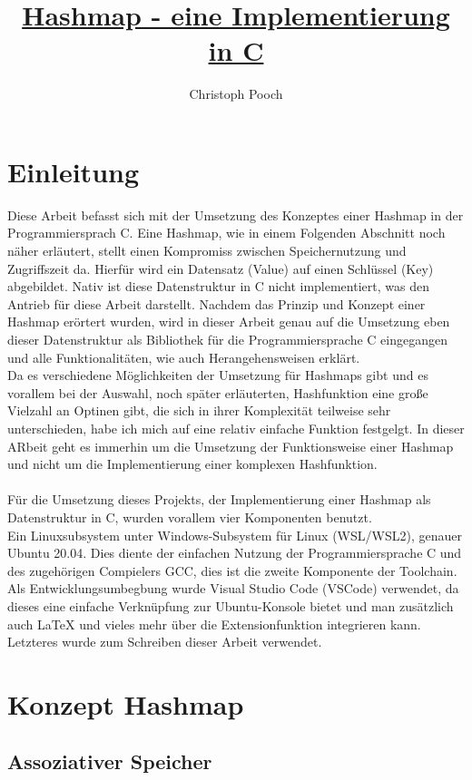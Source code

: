 \documentclass[11pt,a4paper]{article}
\author{Christoph Pooch}
\title{\underline{Hashmap - eine Implementierung in C}}
\begin{document}
\maketitle
\pagebreak
\tableofcontents
\pagebreak
\section{Einleitung}
Diese Arbeit befasst sich mit der Umsetzung des Konzeptes einer Hashmap in der Programmiersprach C.
Eine Hashmap, wie in einem Folgenden Abschnitt noch näher erläutert, stellt einen Kompromiss zwischen 
Speichernutzung und Zugriffszeit da.
Hierfür wird ein Datensatz (Value) auf einen Schlüssel (Key) abgebildet.
Nativ ist diese Datenstruktur in C nicht implementiert, was den Antrieb für diese Arbeit darstellt.
Nachdem das Prinzip und Konzept einer Hashmap erörtert wurden, wird in dieser Arbeit genau auf die Umsetzung 
eben dieser Datenstruktur als Bibliothek für die Programmiersprache C eingegangen und alle Funktionalitäten, 
wie auch Herangehensweisen erklärt.\\
Da es verschiedene Möglichkeiten der Umsetzung für Hashmaps gibt und es vorallem bei der Auswahl, noch 
später erläuterten, Hashfunktion eine große Vielzahl an Optinen gibt, die sich in ihrer Komplexität teilweise 
sehr unterschieden, habe ich mich auf eine relativ einfache Funktion festgelgt. %
In dieser ARbeit geht es immerhin um die Umsetzung der Funktionsweise einer Hashmap und nicht um die Implementierung 
einer komplexen Hashfunktion.\\\\ 
Für die Umsetzung dieses Projekts, der Implementierung einer Hashmap als Datenstruktur in C, wurden vorallem vier
Komponenten benutzt.\\
Ein Linuxsubsystem unter Windows-Subsystem für Linux (WSL/WSL2),
genauer Ubuntu 20.04. Dies diente der einfachen Nutzung der Programmiersprache C und des zugehörigen Compielers GCC, 
dies ist die zweite Komponente der Toolchain.\\
Als Entwicklungsumbegbung wurde Visual Studio Code (VSCode) verwendet, da dieses eine einfache Verknüpfung zur 
Ubuntu-Konsole bietet und man zusätzlich auch LaTeX und vieles mehr über die Extensionfunktion integrieren kann.
Letzteres wurde zum Schreiben dieser Arbeit verwendet.

\section{Konzept Hashmap}
\subsection{Assoziativer Speicher}
\end{document}
